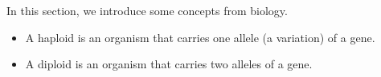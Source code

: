 \documentclass[../book.tex]{subfiles}
\begin{document}
In this section, we introduce some concepts from biology.

\begin{itemize}
  \item A haploid is an organism that carries one allele (a variation) of a gene.
  \item A diploid is an organism that carries two alleles of a gene.
\end{itemize}
\end{document}
